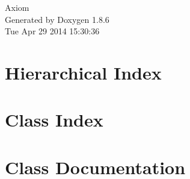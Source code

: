 \documentclass[twoside]{book}
\newcommand{\clearemptydoublepage}{%
  \newpage{\pagestyle{empty}\cleardoublepage}%
}
\begin{document}
\hypersetup{pageanchor=false}
\begin{titlepage}
\vspace*{7cm}
\begin{center}%
{\Large Axiom }\\
\vspace*{1cm}
{\large Generated by Doxygen 1.8.6}\\
\vspace*{0.5cm}
{\small Tue Apr 29 2014 15:30:36}\\
\end{center}
\end{titlepage}
\clearemptydoublepage
\tableofcontents
\clearemptydoublepage
{}
\hypersetup{pageanchor=true}

\chapter{Hierarchical Index}

\chapter{Class Index}

\chapter{Class Documentation}











































\newpage
{}
{}
\printindex
\end{document}
